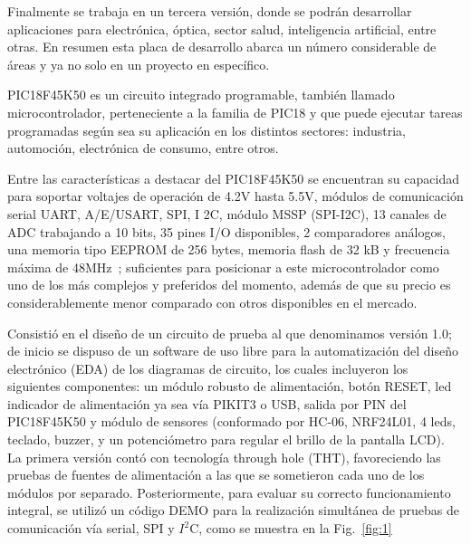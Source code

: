 \documentclass[times, 10pt,twocolumn]{article}
\begin{document}
Finalmente se trabaja en un tercera versión, donde se podrán desarrollar aplicaciones para electrónica, óptica, sector salud, inteligencia artificial, entre otras. En resumen esta placa de desarrollo abarca un número considerable de áreas y ya no solo en un proyecto en específico. 


PIC18F45K50 es un circuito integrado programable, también llamado microcontrolador, perteneciente a la familia de PIC18 y que puede ejecutar tareas programadas según sea su aplicación en los distintos sectores: industria, automoción, electrónica de consumo, entre otros.

Entre las características a destacar del PIC18F45K50 se encuentran su capacidad para soportar voltajes de operación de 4.2V hasta 5.5V, módulos de comunicación serial UART, A/E/USART, SPI, I 2C, módulo MSSP (SPI-I2C), 13 canales de ADC trabajando a 10 bits, 35 pines I/O disponibles, 2 comparadores análogos, una memoria tipo EEPROM de 256 bytes, memoria flash de 32 kB y frecuencia máxima de 48MHz~\cite{ex1}; suficientes para posicionar a este microcontrolador como uno de los más complejos y preferidos del momento, además de que su precio es considerablemente menor comparado con otros disponibles en el mercado.



Consistió en el diseño de un circuito de prueba al que denominamos versión 1.0; de inicio se dispuso de un software de uso libre para la automatización del diseño electrónico (EDA) de los diagramas de circuito, los cuales incluyeron los siguientes componentes: un módulo robusto de alimentación, botón RESET, led indicador de alimentación ya sea vía PIKIT3 o USB, salida por PIN del PIC18F45K50 y módulo de sensores (conformado por HC-06, NRF24L01, 4 leds, teclado, buzzer, y un potenciómetro para regular el brillo de la pantalla LCD). \\

La primera versión contó con tecnología through hole (THT), favoreciendo las pruebas de fuentes de alimentación a las que se sometieron cada uno de los módulos por separado. Posteriormente, para evaluar su correcto funcionamiento integral, se utilizó un
código DEMO para la realización simultánea de pruebas de comunicación vía serial, SPI y $I^{2}$C, como se muestra en la Fig.~\ref{fig:1}
\end{document}
